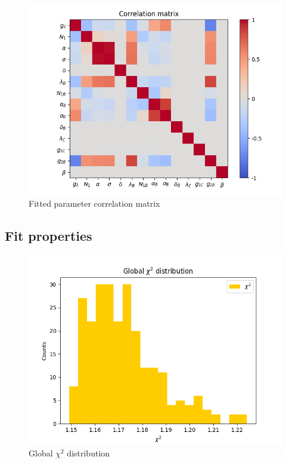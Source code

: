 \documentclass[
]{article}
\begin{document}
\begin{figure}
\centering
\includegraphics{pngplots/CorrelationMatrix.png}
\caption{Fitted parameter correlation matrix}
\end{figure}

\hypertarget{fit-properties}{%
\subsection{Fit properties}\label{fit-properties}}

\begin{figure}
\centering
\includegraphics{pngplots/Globalchi2.png}
\caption{Global \(\chi^2\) distribution}
\end{figure}
\end{document}
